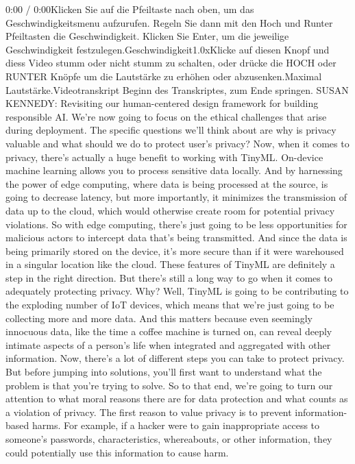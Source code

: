 0:00 / 0:00Klicken Sie auf die Pfeiltaste nach oben, um das Geschwindigkeitsmenu aufzurufen. Regeln Sie dann mit den Hoch und Runter Pfeiltasten die Geschwindigkeit. Klicken Sie Enter, um die jeweilige Geschwindigkeit festzulegen.Geschwindigkeit1.0xKlicke auf diesen Knopf und diess Video stumm oder nicht stumm zu schalten, oder drücke die HOCH oder RUNTER Knöpfe um die Lautstärke zu erhöhen oder abzusenken.Maximal Lautstärke.Videotranskript
Beginn des Transkriptes, zum Ende springen.
SUSAN KENNEDY: Revisiting our human-centered design framework
for building responsible AI.
We're now going to focus on the ethical challenges that
arise during deployment.
The specific questions we'll think about are why is privacy valuable
and what should we do to protect user's privacy?
Now, when it comes to privacy, there's actually
a huge benefit to working with TinyML.
On-device machine learning allows you to process sensitive data locally.
And by harnessing the power of edge computing, where
data is being processed at the source, is going to decrease latency,
but more importantly, it minimizes the transmission
of data up to the cloud, which would otherwise create room
for potential privacy violations.
So with edge computing, there's just going
to be less opportunities for malicious actors
to intercept data that's being transmitted.
And since the data is being primarily stored on the device,
it's more secure than if it were warehoused
in a singular location like the cloud.
These features of TinyML are definitely a step in the right direction.
But there's still a long way to go when it
comes to adequately protecting privacy.
Why?
Well, TinyML is going to be contributing to the exploding
number of IoT devices, which means that we're just going
to be collecting more and more data.
And this matters because even seemingly innocuous data,
like the time a coffee machine is turned on,
can reveal deeply intimate aspects of a person's life
when integrated and aggregated with other information.
Now, there's a lot of different steps you can take to protect privacy.
But before jumping into solutions, you'll
first want to understand what the problem is that you're trying to solve.
So to that end, we're going to turn our attention to what moral reasons there
are for data protection and what counts as a violation of privacy.
The first reason to value privacy is to prevent information-based harms.
For example, if a hacker were to gain inappropriate access
to someone's passwords, characteristics, whereabouts, or other information,
they could potentially use this information to cause harm.
